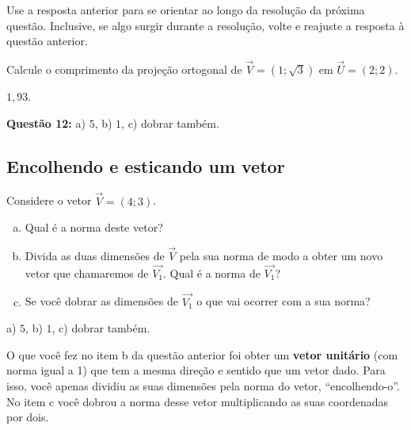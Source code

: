 \documentclass[main.tex]{subfiles}
\begin{document}
Use a resposta anterior para se orientar ao longo da resolução da próxima questão. Inclusive, se algo surgir durante a resolução, volte e reajuste a resposta à questão anterior.

\begin{questao}
\item Calcule o comprimento da projeção ortogonal de $\overrightarrow{V}=(1;\sqrt{3})$ em $\overrightarrow{U}=(2;2)$.
\end{questao}

\begin{gabarito}
	\begin{gabaritoQuestao}
		$1,93$.

\noindent\textbf{Questão 12:} a) $5$, b) $1$, c) dobrar também.
	\end{gabaritoQuestao}
\end{gabarito}


\subsection*{Encolhendo e esticando um vetor}

\begin{questao}
Considere o vetor $\overrightarrow{V}=(4;3)$.
\begin{enumerate}[a)]
\item Qual é a norma deste vetor?
\item Divida as duas dimensões de $\overrightarrow{V}$ pela sua norma de modo a obter um novo vetor que chamaremos de $\overrightarrow{V_1}$. Qual é a norma de $\overrightarrow{V_1}$?
\item Se você dobrar as dimensões de $\overrightarrow{V_1}$ o que vai ocorrer com a sua norma?
\end{enumerate}
\end{questao}

\begin{gabarito}
	\begin{gabaritoQuestao}
		a) $5$, b) $1$, c) dobrar também.
	\end{gabaritoQuestao}
\end{gabarito}

O que você fez no item b da questão anterior foi obter um \textbf{vetor unitário} (com norma igual a 1) que tem a mesma direção e sentido que um vetor dado. Para isso, você apenas dividiu as suas dimensões pela norma do vetor, ``encolhendo-o''. No item c você dobrou a norma desse vetor multiplicando as suas coordenadas por dois.
\end{document}
